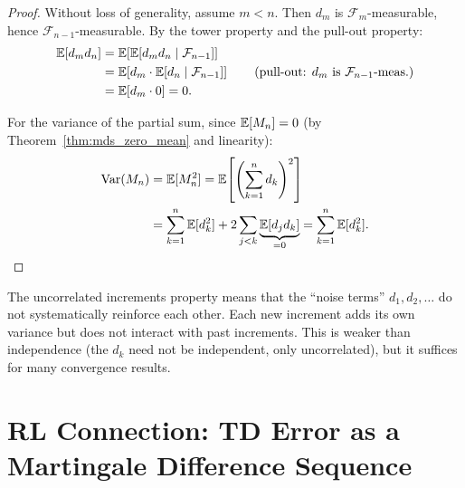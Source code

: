 \documentclass[11pt,a4paper]{article}
\begin{document}
\begin{proof}
Without loss of generality, assume $m < n$.  Then $d_m$ is
$\mathcal{F}_m$-measurable, hence
$\mathcal{F}_{n-1}$-measurable.  By the tower property and the
pull-out property:
\begin{align}
  \E[d_m d_n]
  &= \E\!\left[\E[d_m d_n \mid \mathcal{F}_{n-1}]\right]
  \nonumber\\
  &= \E\!\left[d_m \cdot
    \E[d_n \mid \mathcal{F}_{n-1}]\right]
  \tag{pull-out: $d_m$ is $\mathcal{F}_{n-1}$-meas.}\\
  &= \E[d_m \cdot 0] = 0.
  \label{eq:uncorr_proof}
\end{align}

For the variance of the partial sum, since
$\mathbb{E}[M_n] = 0$ (by Theorem~\ref{thm:mds_zero_mean} and
linearity):
\begin{align}
  \operatorname{Var}(M_n) &= \mathbb{E}[M_n^2]
  = \mathbb{E}\!\left[\left(\sum_{k=1}^n d_k\right)^2\right]
  \nonumber\\
  &= \sum_{k=1}^n \mathbb{E}[d_k^2]
    + 2 \sum_{j < k} \underbrace{\mathbb{E}[d_j d_k]}_{= 0}
  = \sum_{k=1}^n \mathbb{E}[d_k^2]. \qedhere
  \label{eq:var_partial_sum}
\end{align}
\end{proof}

\begin{remark}
The uncorrelated increments property means that the ``noise
terms'' $d_1, d_2, \ldots$ do not systematically reinforce each
other.  Each new increment adds its own variance but does not
interact with past increments.  This is weaker than independence
(the $d_k$ need not be independent, only uncorrelated), but it
suffices for many convergence results.
\end{remark}


\section{RL Connection: TD Error as a Martingale Difference
  Sequence}
\label{sec:td_mds}
\end{document}
